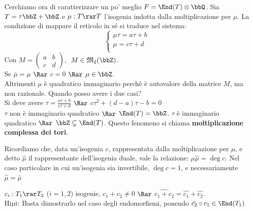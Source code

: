     \noindent Cerchiamo ora di caratterizzare un po' meglio $F=\End(T) \otimes \bbQ$. Sia $T=\tau \bbZ + \bbZ$ e $\mu : T \rar T$ l'isogenia indotta dalla moltiplicazione per $\mu$. La condizione di mappare il reticolo in sé si traduce nel sistema:
    \begin{equation*}
    \begin{cases}
    	\mu \tau = a\tau + b\\
    	\mu = c\tau + d\\
    \end{cases}
    \end{equation*}
    Con $M=
    \begin{pmatrix}
    a & b \\
    c & d
    \end{pmatrix}$, $ \ M\in \mathfrak{M}_{2}(\bbZ)$.\\
    Se $\bar{\mu}=\mu$ $\Rar$ $c=0$ $\Rar$ $\mu \in \bbZ$.\\
    Altrimenti $\mu$ è quadratico immaginario perchè è autovalore della matrice $M$, ma non razionale.
    Quando posso avere i due casi?\\
    Si deve avere $\tau = \frac{a\tau + b}{c\tau + d}$ $\Rar$ $c\tau^{2} + (d-a)\tau - b=0$\\
    $\tau$ non è immaginario quadratico $\Rar$ $\End(T)=\bbZ$.
    $\tau$ è immaginario quadratico $\Rar$ $\bbZ \subsetneq \End(T)$. Questo fenomeno si chiama {\bf moltiplicazione complessa dei tori}.

    Ricordiamo che, data un'isogenia $c$, rappresentata dalla moltiplicazione per $\mu$, e detto $\hat\mu$ il rappresentante dell'isogenia duale, vale la relazione: $\mu \hat\mu = \deg c$. Nel caso particolare in cui un'isogenia sia invertibile, $\deg c = 1$, e necessariamente $\hat\mu = \bar\mu$

     $c_{i}: T_{1} \rar T_{2}$ ($i=1 , 2$) isogenie, $c_{1}+c_{2} \neq 0$ $\Rar$ $\hat{c_{1} + c_{2}}=\hat{c_{1}}+\hat{c_{2}}$.\\
    {\bf $\underline{\mbox{Hint:}}$} Basta dimostrarlo nel caso degli endomorfismi, ponendo $\hat{c_{2}}\circ c_{1} \in \End(T_{1})$
